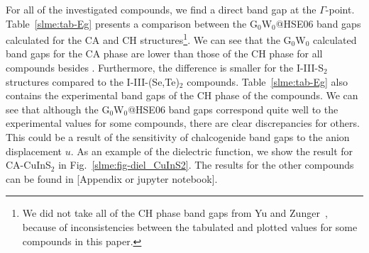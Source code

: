 \begin{refsection}
For all of the investigated compounds, we find a direct band gap at the 
$\Gamma$-point. Table~\ref{slme:tab-Eg} presents a comparison between the 
G$_0$W$_0$@HSE06 band gaps calculated for the CA and CH 
structures\footnote[4]{We did not take all of the CH phase band gaps from Yu 
and Zunger~\cite{Yu2012}, because of inconsistencies between the tabulated and 
plotted values for some compounds in this paper.}. We can see that the 
G$_0$W$_0$ calculated band gaps for the CA phase are lower than those of the 
CH phase for all compounds besides . Furthermore, the difference is 
smaller for the \mbox{I-III-S$_2$} structures compared to the 
\mbox{I-III-(Se,Te)$_2$} compounds. Table~\ref{slme:tab-Eg} also contains the 
experimental band gaps of the CH phase of the compounds. We can see that 
although the G$_0$W$_0$@HSE06 band gaps correspond quite well to the 
experimental values for some compounds, there are clear discrepancies for 
others. This could be a result of the sensitivity of chalcogenide band gaps to 
the anion displacement $u$. As an example of the dielectric function, we show 
the result for \mbox{CA-CuInS$_2$} in Fig.~\ref{slme:fig-diel_CuInS2}. The 
results for the other compounds can be found in [Appendix or jupyter 
notebook]. 
 
 

\end{refsection}
